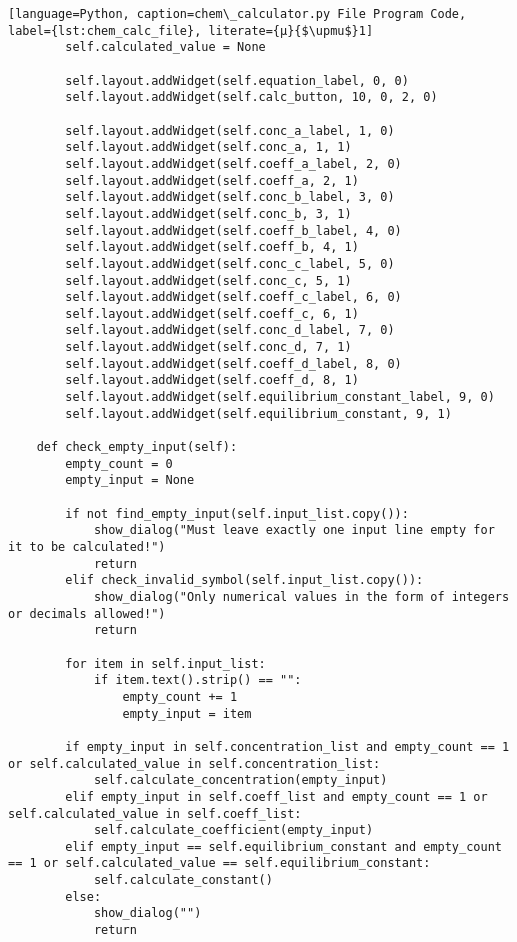 \begin{lstlisting}[language=Python, caption=chem\_calculator.py File Program Code, label={lst:chem_calc_file}, literate={μ}{$\upmu$}1]
        self.calculated_value = None

        self.layout.addWidget(self.equation_label, 0, 0)
        self.layout.addWidget(self.calc_button, 10, 0, 2, 0)

        self.layout.addWidget(self.conc_a_label, 1, 0)
        self.layout.addWidget(self.conc_a, 1, 1)
        self.layout.addWidget(self.coeff_a_label, 2, 0)
        self.layout.addWidget(self.coeff_a, 2, 1)
        self.layout.addWidget(self.conc_b_label, 3, 0)
        self.layout.addWidget(self.conc_b, 3, 1)
        self.layout.addWidget(self.coeff_b_label, 4, 0)
        self.layout.addWidget(self.coeff_b, 4, 1)
        self.layout.addWidget(self.conc_c_label, 5, 0)
        self.layout.addWidget(self.conc_c, 5, 1)
        self.layout.addWidget(self.coeff_c_label, 6, 0)
        self.layout.addWidget(self.coeff_c, 6, 1)
        self.layout.addWidget(self.conc_d_label, 7, 0)
        self.layout.addWidget(self.conc_d, 7, 1)
        self.layout.addWidget(self.coeff_d_label, 8, 0)
        self.layout.addWidget(self.coeff_d, 8, 1)
        self.layout.addWidget(self.equilibrium_constant_label, 9, 0)
        self.layout.addWidget(self.equilibrium_constant, 9, 1)

    def check_empty_input(self):
        empty_count = 0
        empty_input = None

        if not find_empty_input(self.input_list.copy()):
            show_dialog("Must leave exactly one input line empty for it to be calculated!")
            return
        elif check_invalid_symbol(self.input_list.copy()):
            show_dialog("Only numerical values in the form of integers or decimals allowed!")
            return

        for item in self.input_list:
            if item.text().strip() == "":
                empty_count += 1
                empty_input = item

        if empty_input in self.concentration_list and empty_count == 1 or self.calculated_value in self.concentration_list:
            self.calculate_concentration(empty_input)
        elif empty_input in self.coeff_list and empty_count == 1 or self.calculated_value in self.coeff_list:
            self.calculate_coefficient(empty_input)
        elif empty_input == self.equilibrium_constant and empty_count == 1 or self.calculated_value == self.equilibrium_constant:
            self.calculate_constant()
        else:
            show_dialog("")
            return


\end{lstlisting}

